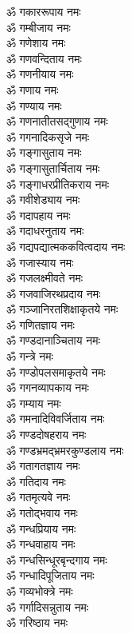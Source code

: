 \begin{flushleft}
\begin{multicols}{2}
ॐ गकाररूपाय नमः\\
ॐ गम्बीजाय नमः\\
ॐ गणेशाय नमः\\
ॐ गणवन्दिताय नमः\\
ॐ गणनीयाय नमः\\
ॐ गणाय नमः\\
ॐ गण्याय नमः\\
ॐ गणनातीतसद्गुणाय नमः\\
ॐ गगनादिकसृजे नमः\\
ॐ गङ्गासुताय नमः\hfill{}\\
ॐ गङ्गासुतार्चिताय नमः\\
ॐ गङ्गाधरप्रीतिकराय नमः\\
ॐ गवीशेड्याय नमः\\
ॐ गदापहाय नमः\\
ॐ गदाधरनुताय नमः\\
ॐ गद्यपद्यात्मककवित्वदाय नमः\\
ॐ गजास्याय नमः\\
ॐ गजलक्ष्मीवते नमः\\
ॐ गजवाजिरथप्रदाय नमः\\
ॐ गञ्जानिरतशिक्षाकृतये नमः\hfill{}\\
ॐ गणितज्ञाय नमः\\
ॐ गण्डदानाञ्चिताय नमः\\
ॐ गन्त्रे नमः\\
ॐ गण्डोपलसमाकृतये नमः\\
ॐ गगनव्यापकाय नमः\\
ॐ गम्याय नमः\\
ॐ गमनादिविवर्जिताय नमः\\
ॐ गण्डदोषहराय नमः\\
ॐ गण्डभ्रमद्भ्रमरकुण्डलाय नमः\\
ॐ गतागतज्ञाय नमः\hfill{}\\
ॐ गतिदाय नमः\\
ॐ गतमृत्यवे नमः\\
ॐ गतोद्भवाय नमः\\
ॐ गन्धप्रियाय नमः\\
ॐ गन्धवाहाय नमः\\
ॐ गन्धसिन्धूरबृन्दगाय नमः\\
ॐ गन्धादिपूजिताय नमः\\
ॐ गव्यभोक्त्रे नमः\\
ॐ गर्गादिसन्नुताय नमः\\
ॐ गरिष्ठाय नमः\hfill{}\\

\end{multicols}
\end{flushleft}
